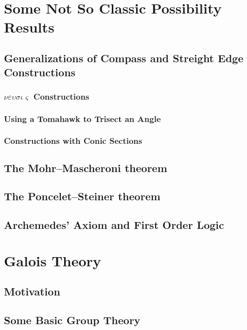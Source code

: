 \documentclass[11pt,a4paper]{article}
\theoremstyle{theorem}
\theoremstyle{definition}
\theoremstyle{definition}
\theoremstyle{remark}
\theoremstyle{definition}
\theoremstyle{remark}
\begin{document}
\section{Some Not So Classic Possibility Results}

\subsection{Generalizations of Compass and Streight Edge Constructions}

\subsubsection{$\nu \varepsilon \upsilon \sigma \iota \varsigma$ Constructions}

\subsubsection{Using a Tomahawk to Trisect an Angle}

\subsubsection{Constructions with Conic Sections}

\subsection{The Mohr–Mascheroni theorem}

\subsection{The Poncelet–Steiner theorem}

\subsection{Archemedes' Axiom and First Order Logic}

\section{Galois Theory}

\subsection{Motivation}

\subsection{Some Basic Group Theory}
\end{document}
